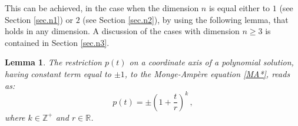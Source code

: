 \documentclass[11pt, reqno]{amsart}
\newtheorem{lem}[theor]{Lemma}
\newcommand{\Z}{\mathds{Z}}
\newcommand{\R}{\mathds{R}}
\begin{document}
\smallskip\noindent
This can be achieved, in the case when the dimension $n$ is equal either to $1$ (see Section \ref{sec.n1}) or $2$ (see Section \ref{sec.n2}), by using the following lemma, that holds in any dimension. A discussion of the cases with dimension $n\geq 3$ is contained in Section \ref{sec.n3}.
%
\begin{lem}\label{pt}
The restriction $p(t)$ on a coordinate axis  of a polynomial solution, having constant term  equal to $\pm1$, to the Monge-Amp\`ere equation \eqref{MA*}, reads as:
\begin{equation*}%
  p(t)=\pm\left(1+ \frac{t}{r}\right)^k\,,
\end{equation*}
where $k\in\Z^+$ and $r\in\R$.
\end{lem}
%
\end{document}
